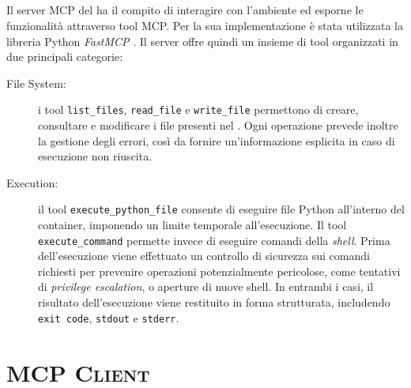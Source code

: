 \subsection{\sandmcpserver{}} %

Il server MCP del \sandbox{} ha il compito di interagire con l'ambiente ed esporne le funzionalità attraverso tool MCP. Per la sua implementazione è stata utilizzata la libreria Python \emph{FastMCP} \cite{prefect2026fastmcp}. Il server offre quindi un insieme di tool organizzati in due principali categorie:



\begin{description}
    \item[File System:] i tool \texttt{list\_files}, \texttt{read\_file} e \texttt{write\_file} permettono di creare, consultare e modificare i file presenti nel \sandbox{}. Ogni operazione prevede inoltre la gestione degli errori, così da fornire un'informazione esplicita in caso di esecuzione non riuscita.

    \item[Execution:] il tool \texttt{execute\_python\_file} consente di eseguire file Python all'interno del container, imponendo un limite temporale all'esecuzione. Il tool \texttt{execute\_command} permette invece di eseguire comandi della \emph{shell}. Prima dell'esecuzione viene effettuato un controllo di sicurezza sui comandi richiesti per prevenire operazioni potenzialmente pericolose, come tentativi di \emph{privilege escalation}, o aperture di nuove shell. In entrambi i casi, il risultato dell'esecuzione viene restituito in forma strutturata, includendo \texttt{exit code}, \texttt{stdout} e \texttt{stderr}.

\end{description}

\section{\textsc{MCP Client}} %

